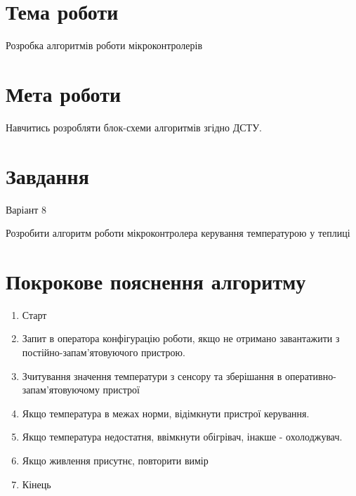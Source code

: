 \documentclass[a4paper]{article}
\begin{document}
\section*{Тема роботи}
Розробка алгоритмів роботи мікроконтролерів

\section*{Мета роботи}
Навчитись розробляти блок-схеми алгоритмів згідно ДСТУ.

\section*{Завдання}
Варіант 8

Розробити алгоритм роботи мікроконтролера керування температурою у
теплиці



\section*{Покрокове пояснення алгоритму}
\begin{enumerate}
    \item Старт
    \item Запит в оператора конфігурацію роботи, якщо не отримано завантажити з постійно-запам'ятовуючого пристрою.
    \item Зчитування значення температури з сенсору та зберішання в оперативно-запам'ятовуючому пристрої
    \item Якщо температура в межах норми, відімкнути пристрої керування.
    \item Якщо температура недостатня, ввімкнути обігрівач, інакше - охолоджувач.
    \item Якщо живлення присутнє, повторити вимір
    \item Кінець
\end{enumerate}

\newpage
\end{document}
